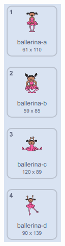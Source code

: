 \documentclass[10pt, a4paper]{article}
\begin{document}
\begin{enumerate}
\begin{figure}[htbp]
\begin{minipage}[t]{.35\textwidth}
\begin{minipage}[t]{.18\textwidth}
                    \includegraphics[width=.7\textwidth]{7-1.png}

\end{minipage}
\end{minipage}
\end{figure}
\end{enumerate}
\end{document}
